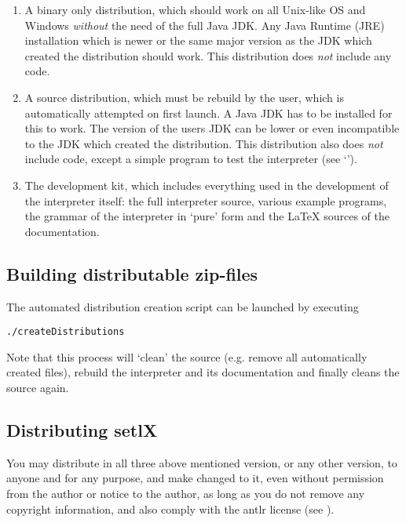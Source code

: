 \begin{enumerate}
	\item A binary only distribution, which should work on all Unix-like OS and Windows \emph{without} the need of the full Java JDK. Any Java Runtime (JRE) installation which is newer or the same major version as the JDK which created the distribution should work. This distribution does \emph{not} include any \SetlX{} code.

	\item A source distribution, which must be rebuild by the user, which is automatically attempted on first launch. A Java JDK has to be installed for this to work. The version of the users JDK can be lower or even incompatible to the JDK which created the distribution. This distribution also does \emph{not} include \SetlX{} code, except a simple program to test the interpreter (see `').

	\item The development kit, which includes everything used in the development of the interpreter itself: the full interpreter source, various \SetlX{} example programs, the grammar of the interpreter in `pure' form and the \LaTeX{} sources of the documentation.
\end{enumerate}

\subsection{Building distributable zip-files}

The automated distribution creation script can be launched by executing

\begin{lstlisting}[frame=none,numbers=none]
./createDistributions
\end{lstlisting}

Note that this process will `clean' the source (e.g. remove all automatically created files), rebuild the interpreter and its documentation and finally cleans the source again.

\subsection{Distributing setlX}

You may distribute \setlX{} in all three above mentioned version, or any other version, to anyone and for any purpose, and make changed to it, even without permission from the author or notice to the author, as long as you do not remove any copyright information, and also comply with the antlr license (see ).

